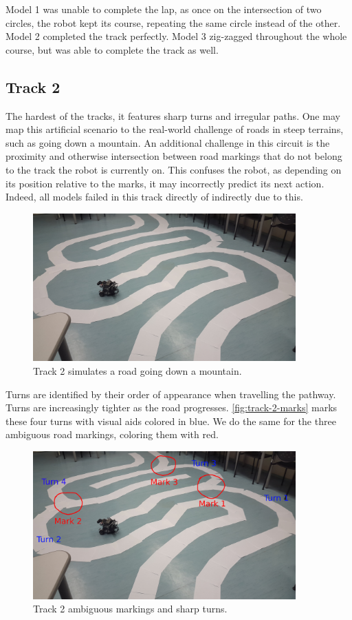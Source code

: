 Model 1 was unable to complete the lap, as once on the intersection of two circles, the robot kept
its course, repeating the same circle instead of the other. Model 2 completed the track perfectly.
Model 3 zig-zagged throughout the whole course, but was able to complete the track as well.

\subsection{Track 2}

The hardest of the tracks, it features sharp turns and irregular paths. One may map this artificial
scenario to the real-world challenge of roads in steep terrains, such as going down a mountain. An
additional challenge in this circuit is the proximity and otherwise intersection between road
markings that do not belong to the track the robot is currently on. This confuses the robot, as
depending on its position relative to the marks, it may incorrectly predict its next action.
Indeed, all models failed in this track directly of indirectly due to this.

\begin{figure}[h]
  \centering\includegraphics[width=0.9\textwidth]{imgs/track_2.jpg}
  \caption{Track 2 simulates a road going down a mountain.}
\end{figure}

Turns are identified by their order of appearance when travelling the pathway. Turns are
increasingly tighter as the road progresses. \autoref{fig:track-2-marks} marks these four turns
with visual aids colored in blue. We do the same for the three ambiguous road markings, coloring
them with red.

\begin{figure}[h]
  \centering\includegraphics[width=0.9\textwidth]{imgs/track_2_marks.jpg}
  \caption{Track 2 ambiguous markings and sharp turns.}
\end{figure}

